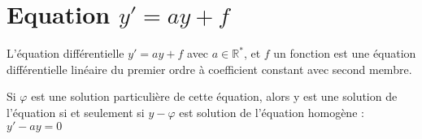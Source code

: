 \section{Equation \(y' = ay +f\) }

L'équation différentielle \(y' = ay + f\) avec \(a \in \mathbb{R}^{*}\), et \(f\) un fonction est une équation différentielle linéaire du premier ordre à coefficient constant avec second membre.\\
\begin{corollary}\label{col:solpart}
    Si \(\varphi \) est une solution particulière de cette équation, alors y est une solution de l'équation si et seulement si \(y- \varphi \) est solution de l'équation homogène : \(y'-ay = 0\) 
\end{corollary}

